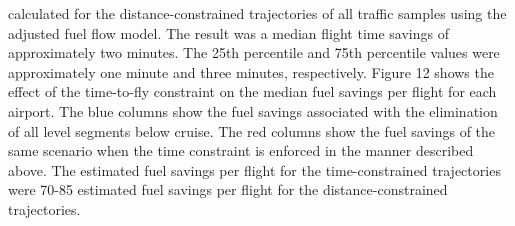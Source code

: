 \documentclass{aer1315-pretty}
\begin{document}
\begin{itemize}
calculated for the distance-constrained trajectories of all traffic samples using the adjusted fuel flow model. The
result was a median flight time savings of approximately two minutes. The 25th percentile and 75th percentile values
were approximately one minute and three minutes, respectively.
    Figure 12 shows the effect of the time-to-fly constraint on the median fuel savings per flight for each airport. The
blue columns show the fuel savings associated with the elimination of all level segments below cruise. The red
columns show the fuel savings of the same scenario when the time constraint is enforced in the manner described
above. The estimated fuel savings per flight for the time-constrained trajectories were 70-85%
estimated fuel savings per flight for the distance-constrained trajectories.




\end{itemize}
\end{document}

